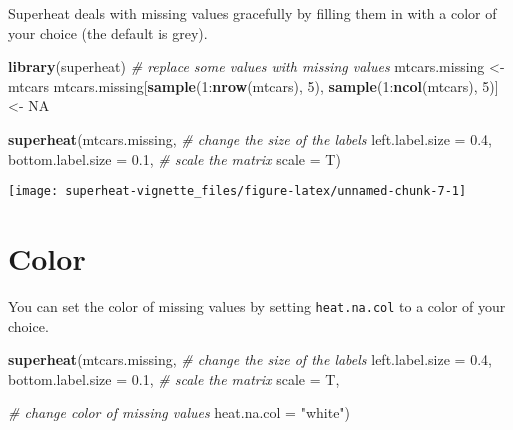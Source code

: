 \documentclass[]{book}
\newenvironment{Shaded}{\begin{snugshade}}{\end{snugshade}}
\newcommand{\KeywordTok}[1]{\textcolor[rgb]{0.13,0.29,0.53}{\textbf{{#1}}}}
\newcommand{\DataTypeTok}[1]{\textcolor[rgb]{0.13,0.29,0.53}{{#1}}}
\newcommand{\DecValTok}[1]{\textcolor[rgb]{0.00,0.00,0.81}{{#1}}}
\newcommand{\FloatTok}[1]{\textcolor[rgb]{0.00,0.00,0.81}{{#1}}}
\newcommand{\StringTok}[1]{\textcolor[rgb]{0.31,0.60,0.02}{{#1}}}
\newcommand{\CommentTok}[1]{\textcolor[rgb]{0.56,0.35,0.01}{\textit{{#1}}}}
\newcommand{\OtherTok}[1]{\textcolor[rgb]{0.56,0.35,0.01}{{#1}}}
\newcommand{\NormalTok}[1]{{#1}}
\theoremstyle{definition}
\theoremstyle{definition}
\theoremstyle{remark}
\begin{document}
Superheat deals with missing values gracefully by filling them in with a
color of your choice (the default is grey).

\begin{Shaded}
\begin{Highlighting}[]
\KeywordTok{library}\NormalTok{(superheat)}
\CommentTok{# replace some values with missing values}
\NormalTok{mtcars.missing <-}\StringTok{ }\NormalTok{mtcars}
\NormalTok{mtcars.missing[}\KeywordTok{sample}\NormalTok{(}\DecValTok{1}\NormalTok{:}\KeywordTok{nrow}\NormalTok{(mtcars), }\DecValTok{5}\NormalTok{),}
               \KeywordTok{sample}\NormalTok{(}\DecValTok{1}\NormalTok{:}\KeywordTok{ncol}\NormalTok{(mtcars), }\DecValTok{5}\NormalTok{)] <-}\StringTok{ }\OtherTok{NA}

\KeywordTok{superheat}\NormalTok{(mtcars.missing,}
          \CommentTok{# change the size of the labels}
          \DataTypeTok{left.label.size =} \FloatTok{0.4}\NormalTok{,}
          \DataTypeTok{bottom.label.size =} \FloatTok{0.1}\NormalTok{,}
          \CommentTok{# scale the matrix}
          \DataTypeTok{scale =} \NormalTok{T)}
\end{Highlighting}
\end{Shaded}

\begin{center}\texttt{[image: superheat-vignette\_files/figure-latex/unnamed-chunk-7-1]} \end{center}

\section{Color}\label{color}

You can set the color of missing values by setting \texttt{heat.na.col}
to a color of your choice.

\begin{Shaded}
\begin{Highlighting}[]
\KeywordTok{superheat}\NormalTok{(mtcars.missing,}
          \CommentTok{# change the size of the labels}
          \DataTypeTok{left.label.size =} \FloatTok{0.4}\NormalTok{,}
          \DataTypeTok{bottom.label.size =} \FloatTok{0.1}\NormalTok{,}
          \CommentTok{# scale the matrix}
          \DataTypeTok{scale =} \NormalTok{T,}
          
          \CommentTok{# change color of missing values}
          \DataTypeTok{heat.na.col =} \StringTok{"white"}\NormalTok{)}
\end{Highlighting}
\end{Shaded}
\end{document}
